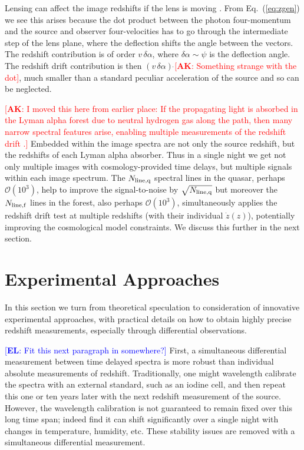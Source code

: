 \documentclass[preprint2, 10pt]{aastex}
\newcommand{\eric}[1]{\textcolor{blue}{[{\bf EL}: #1]}}
\newcommand{\alex}[1]{\textcolor{red}{[{\bf AK}: #1]}}
\begin{document}
Lensing can affect the image redshifts if the lens is moving 
\citep{mitrofanov,birkgull}.  From 
Eq.~(\ref{eq:zgen}) we see this arises because the dot product between 
the photon four-momentum and the source and observer four-velocities 
has to go through the intermediate step of the lens plane, where the 
deflection shifts the angle between the vectors.  The redshift contribution 
is of order $v\,\delta\alpha$, where $\delta\alpha\sim\psi$ is the 
deflection angle.  The redshift drift contribution is then 
$(v\,\delta\alpha)\,\dot{}$\alex{Something strange with the dot}, much smaller than a standard peculiar 
acceleration of the source and so can be neglected. 

\alex{I moved this here from earlier place: If the propagating light is 
absorbed in the Lyman alpha forest due to neutral hydrogen gas along 
the path, then many narrow spectral features arise, enabling multiple 
measurements of the redshift drift \citep{2008MNRAS.386.1192L}.}
Embedded within the image spectra are not only the source redshift, but 
the redshifts of each Lyman alpha absorber.  Thus in a single night we get 
not only multiple images with cosmology-provided time delays, but multiple 
signals within each image spectrum.  The $N_{\rm line,q}$ spectral lines 
in the quasar, perhaps ${\mathcal O}(10^3)$, help to improve the 
signal-to-noise by $\sqrt{N_{\rm line,q}}$ but moreover the 
$N_{\rm line,f}$ lines in the forest, also perhaps ${\mathcal O}(10^3)$, 
simultaneously applies the redshift drift test at multiple redshifts 
(with their individual $\dot z(z)$), potentially improving the cosmological 
model constraints.  We discuss this further in the next section. 


\section{Experimental Approaches} \label{sec:tech} 

In this section we turn from theoretical speculation to consideration of 
innovative experimental approaches, with practical details on how to 
obtain highly precise redshift measurements, especially through differential 
observations. 

\eric{Fit this next paragraph in somewhere?} 
First, a simultaneous differential measurement between time delayed spectra 
is more robust than individual absolute measurements of redshift.  
Traditionally, one might wavelength calibrate the spectra with an external 
standard, such as an iodine cell, and then repeat this one or ten years 
later with the next redshift measurement of the source.  However, the 
wavelength calibration is not guaranteed to remain fixed over this long time 
span; indeed \citet{griest1,griest2} find it can shift significantly over a 
single 
night with changes in temperature, humidity, etc.  These stability issues 
are removed with a simultaneous differential measurement. 
\end{document}
